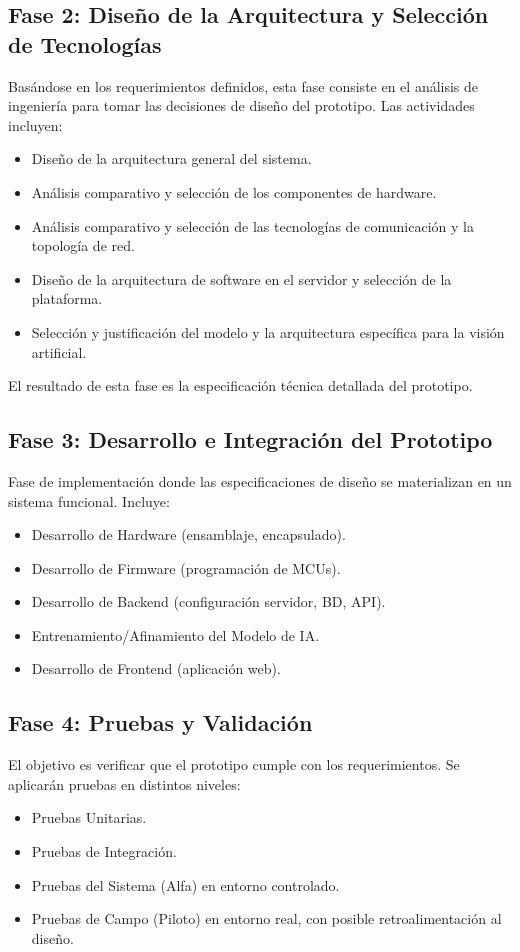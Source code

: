 \subsection{Fase 2: Diseño de la Arquitectura y Selección de Tecnologías} 
\label{subsec:met_fase2} 
Basándose en los requerimientos definidos, esta fase consiste en el análisis de ingeniería para tomar las decisiones de diseño del prototipo.
Las actividades incluyen:
\begin{itemize}
    \item Diseño de la arquitectura general del sistema.
    \item Análisis comparativo y selección de los componentes de hardware.
    \item Análisis comparativo y selección de las tecnologías de comunicación y la topología de red.
    \item Diseño de la arquitectura de software en el servidor y selección de la plataforma.
    \item Selección y justificación del modelo y la arquitectura específica para la visión artificial.
\end{itemize}
El resultado de esta fase es la especificación técnica detallada del prototipo.

\subsection{Fase 3: Desarrollo e Integración del Prototipo} 
\label{subsec:met_fase3} 
Fase de implementación donde las especificaciones de diseño se materializan en un sistema funcional. Incluye:
\begin{itemize}
    \item Desarrollo de Hardware (ensamblaje, encapsulado).
    \item Desarrollo de Firmware (programación de MCUs).
    \item Desarrollo de Backend (configuración servidor, BD, API).
    \item Entrenamiento/Afinamiento del Modelo de IA.
    \item Desarrollo de Frontend (aplicación web).
\end{itemize}

\subsection{Fase 4: Pruebas y Validación} 
\label{subsec:met_fase4} 
El objetivo es verificar que el prototipo cumple con los requerimientos. Se aplicarán pruebas en distintos niveles:
\begin{itemize}
    \item Pruebas Unitarias.
    \item Pruebas de Integración.
    \item Pruebas del Sistema (Alfa) en entorno controlado.
    \item Pruebas de Campo (Piloto) en entorno real, con posible retroalimentación al diseño.
\end{itemize}

